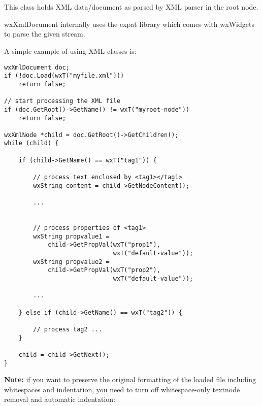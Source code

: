 
\section{}\label{wxxmldocument}

This class holds XML data/document as parsed by XML parser in the root node.

wxXmlDocument internally uses the expat library which comes with wxWidgets to parse the given stream.

A simple example of using XML classes is:

\begin{verbatim}
wxXmlDocument doc;
if (!doc.Load(wxT("myfile.xml")))
    return false;

// start processing the XML file
if (doc.GetRoot()->GetName() != wxT("myroot-node"))
    return false;

wxXmlNode *child = doc.GetRoot()->GetChildren();
while (child) {

    if (child->GetName() == wxT("tag1")) {

        // process text enclosed by <tag1></tag1>
        wxString content = child->GetNodeContent();

        ...


        // process properties of <tag1>
        wxString propvalue1 = 
            child->GetPropVal(wxT("prop1"), 
                              wxT("default-value"));
        wxString propvalue2 = 
            child->GetPropVal(wxT("prop2"), 
                              wxT("default-value"));

        ...

    } else if (child->GetName() == wxT("tag2")) {

        // process tag2 ...
    }

    child = child->GetNext();
}
\end{verbatim}

{\bf Note:} if you want to preserve the original formatting of the loaded file including whitespaces
and indentation, you need to turn off whitespace-only textnode removal and automatic indentation:

